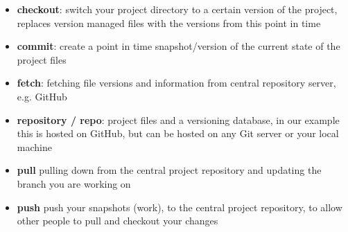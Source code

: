 \begin{itemize}[leftmargin=*]
	\item
		\textbf{checkout}:
		switch your project directory to a certain version of the project, replaces version managed files with the versions from this point in time
	\item
		\textbf{commit}:
		create a point in time snapshot/version of the current state of the project files
	\item
        \textbf{fetch}:
        fetching file versions and information from central repository server, e.g. GitHub
    \item
        \textbf{repository / repo}:
        project files and a versioning database, in our example this is hosted on GitHub, but can be hosted on any Git server or your local machine
    \item
    	\textbf{pull}
    	pulling down from the central project repository and updating the branch you are working on
    \item
    	\textbf{push}
    	push your snapshots (work), to the central project repository, to allow other people to pull and checkout your changes

\end{itemize}